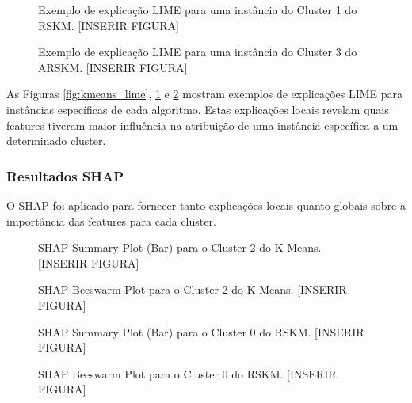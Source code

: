 \documentclass[conference]{IEEEtran}
\begin{document}
\begin{figure}[!t]
\centering
\caption{Exemplo de explicação LIME para uma instância do Cluster 1 do RSKM. [INSERIR FIGURA]}
\label{fig:rskm_lime}
\end{figure}

\begin{figure}[!t]
\centering
\caption{Exemplo de explicação LIME para uma instância do Cluster 3 do ARSKM. [INSERIR FIGURA]}
\label{fig:arskm_lime}
\end{figure}

As Figuras \ref{fig:kmeans_lime}, \ref{fig:rskm_lime} e \ref{fig:arskm_lime} mostram exemplos de explicações LIME para instâncias específicas de cada algoritmo. Estas explicações locais revelam quais features tiveram maior influência na atribuição de uma instância específica a um determinado cluster.

\subsubsection{Resultados SHAP}
O SHAP foi aplicado para fornecer tanto explicações locais quanto globais sobre a importância das features para cada cluster.

\begin{figure}[!t]
\centering
\caption{SHAP Summary Plot (Bar) para o Cluster 2 do K-Means. [INSERIR FIGURA]}
\label{fig:kmeans_shap_bar}
\end{figure}

\begin{figure}[!t]
\centering
\caption{SHAP Beeswarm Plot para o Cluster 2 do K-Means. [INSERIR FIGURA]}
\label{fig:kmeans_shap_beeswarm}
\end{figure}

\begin{figure}[!t]
\centering
\caption{SHAP Summary Plot (Bar) para o Cluster 0 do RSKM. [INSERIR FIGURA]}
\label{fig:rskm_shap_bar}
\end{figure}

\begin{figure}[!t]
\centering
\caption{SHAP Beeswarm Plot para o Cluster 0 do RSKM. [INSERIR FIGURA]}
\label{fig:rskm_shap_beeswarm}
\end{figure}
\end{document}
